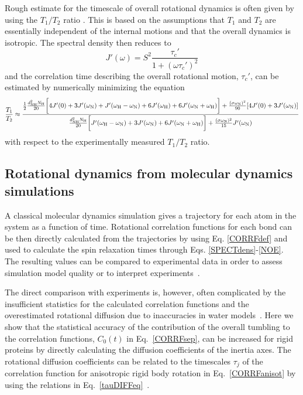 \documentclass[journal=jpcbfk,manuscript=article]{achemso}
\begin{document}
Rough estimate for the timescale of overall rotational dynamics 
is often given by using the $T_1/T_2$ ratio \cite{kay89}. 
This is based on the assumptions that $T_1$ and $T_2$
are essentially independent of the internal motions and that the overall
dynamics is isotropic. The spectral density then reduces to 
\begin{equation}
J'(\omega) = S^2\frac{\tau_c'}{1+(\omega \tau_c')^2} 
\end{equation}
and the correlation time describing the overall rotational motion, $\tau_c'$, can 
be estimated by numerically minimizing the equation
\begin{equation}\label{ratioEQ}
  \frac{T_1}{T_2} \approx  \frac{\frac{1}{2}\frac{d_{\rm{NH}}^2N_{\rm{H}}}{20}\bigg[4J'(0)+3J'(\omega_{\rm{N}})+J'(\omega_{\rm{H}}-\omega_{\rm{N}})+6J'(\omega_{\rm{H}})  +6J'(\omega_{\rm{N}}+\omega_{\rm{H}})\bigg]+\frac{(\sigma \omega_{\rm{N}})^2}{90}[4J'(0) +3J'(\omega_{\rm{N}})]}{\frac{d_{\rm{NH}}^2N_{\rm{H}}}{20}\bigg[J'(\omega_{\rm{H}}-\omega_{\rm{N}})+3J'(\omega_{\rm{N}})+6J'(\omega_{\rm{N}}+\omega_{\rm{H}})\bigg] +\frac{(\sigma \omega_{\rm{N}})^2}{15}J'(\omega_{\rm{N}})}
\end{equation}
with respect to the experimentally measured $T_1/T_2$ ratio.

\subsection{Rotational dynamics from molecular dynamics simulations}\label{MDanalysis}
A classical molecular dynamics simulation gives a trajectory for each atom in
the system as a function of time. Rotational correlation functions for each bond
can be then directly calculated from the trajectories by using Eq. \ref{CORRFdef}
and used to calculate the spin relaxation times through Eqs. \ref{SPECTdens}-\ref{NOE}.
The resulting values can be compared to experimental data in order to assess simulation model
quality \cite{best04,showalter07a,showalter07b,maragakis08,trbovic08,fisette12} or
to interpret experiments~\cite{fisette12}.

The direct comparison with experiments is, however, often complicated by
the insufficient statistics for the calculated correlation functions and the overestimated
rotational diffusion due to inaccuracies in water models~\cite{wong08,anderson12}.
Here we show that the statistical accuracy of the contribution of the
overall tumbling to the correlation functions, $C_0(t)$ in Eq.~\ref{CORRFsep}, can be increased for
rigid proteins by directly calculating the diffusion coefficients of the inertia axes.
The rotational diffusion coefficients can be related to the timescales $\tau_j$
of the correlation function for anisotropic rigid body rotation
in Eq.~\ref{CORRFanisot} by using the relations in Eq.~\ref{tauDIFFeq}~\cite{woessner62}.
\end{document}
